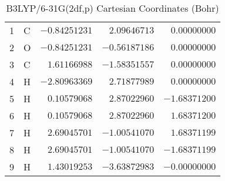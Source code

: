 \documentclass[10pt,oneside]{article}
\begin{document}
\begin{table}[h!]
\centering
\caption{B3LYP/6-31G(2df,p) Cartesian Coordinates (Bohr)}
\begin{tabular}{llrrr}
1  & C  & $-0.84251231$ & $ 2.09646713$ & $ 0.00000000$ \\
2  & O  & $-0.84251231$ & $-0.56187186$ & $ 0.00000000$ \\
3  & C  & $ 1.61166988$ & $-1.58351557$ & $ 0.00000000$ \\
4  & H  & $-2.80963369$ & $ 2.71877989$ & $ 0.00000000$ \\
5  & H  & $ 0.10579068$ & $ 2.87022960$ & $-1.68371200$ \\
6  & H  & $ 0.10579068$ & $ 2.87022960$ & $ 1.68371200$ \\
7  & H  & $ 2.69045701$ & $-1.00541070$ & $ 1.68371199$ \\
8  & H  & $ 2.69045701$ & $-1.00541070$ & $-1.68371199$ \\
9  & H  & $ 1.43019253$ & $-3.63872983$ & $-0.00000000$ \\
\end{tabular}
\end{table}

\clearpage
\end{document}
